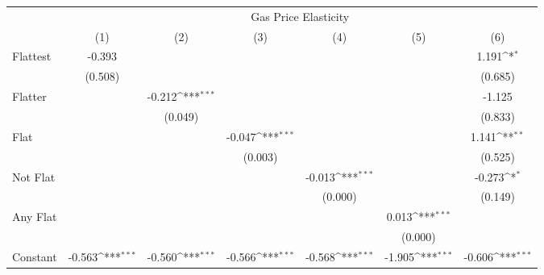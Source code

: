 {
\def\sym#1{\ifmmode^{#1}\else\(^{#1}\)\fi}
\begin{tabular}{l*{6}{c}}
\hline\hline
            &\multicolumn{6}{c}{Gas Price Elasticity}                                                                                           \\
            &\multicolumn{1}{c}{(1)}         &\multicolumn{1}{c}{(2)}         &\multicolumn{1}{c}{(3)}         &\multicolumn{1}{c}{(4)}         &\multicolumn{1}{c}{(5)}         &\multicolumn{1}{c}{(6)}         \\
\hline
Flattest    &      -0.393         &                     &                     &                     &                     &       1.191\sym{*}  \\
            &     (0.508)         &                     &                     &                     &                     &     (0.685)         \\
[1em]
Flatter     &                     &      -0.212\sym{***}&                     &                     &                     &      -1.125         \\
            &                     &     (0.049)         &                     &                     &                     &     (0.833)         \\
[1em]
Flat        &                     &                     &      -0.047\sym{***}&                     &                     &       1.141\sym{**} \\
            &                     &                     &     (0.003)         &                     &                     &     (0.525)         \\
[1em]
Not Flat    &                     &                     &                     &      -0.013\sym{***}&                     &      -0.273\sym{*}  \\
            &                     &                     &                     &     (0.000)         &                     &     (0.149)         \\
[1em]
Any Flat    &                     &                     &                     &                     &       0.013\sym{***}&                     \\
            &                     &                     &                     &                     &     (0.000)         &                     \\
[1em]
Constant    &      -0.563\sym{***}&      -0.560\sym{***}&      -0.566\sym{***}&      -0.568\sym{***}&      -1.905\sym{***}&      -0.606\sym{***}\\

\end{tabular}}
